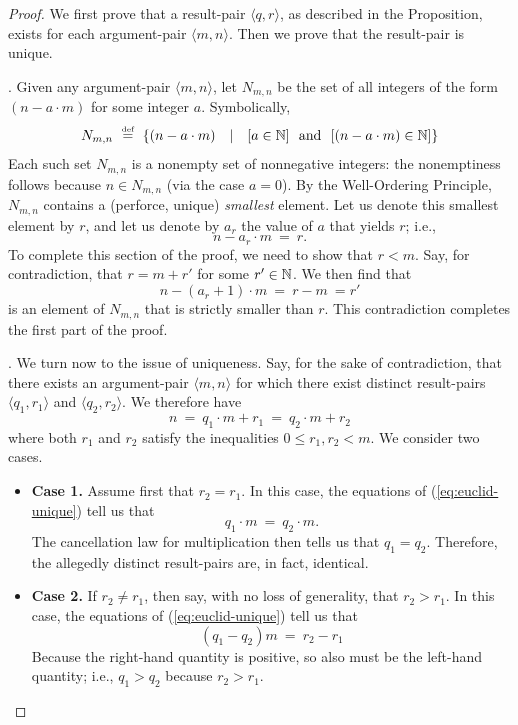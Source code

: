 \begin{proof}
We first prove that a result-pair $\langle q, r \rangle$, as described in the Proposition, exists for each argument-pair $\langle m, n \rangle$.  Then we prove that the result-pair is unique.

\medskip

.
Given any argument-pair $\langle m, n \rangle$, let $N_{m,n}$ be the set of all integers of the form $(n - a \cdot m)$ for some integer $a$.  Symbolically,
\[ N_{m,n} \ \eqdef \ \{ (n - a \cdot m) \ \ \ | \ \ \   [ a  \in \N] \  \mbox{ and } \ 
[(n - a \cdot m) \in \N]  \}
\]
Each such set $N_{m,n}$ is a nonempty set of nonnegative integers: the nonemptiness follows because $n \in N_{m,n}$ (via the case $a=0$).  By the Well-Ordering Principle, $N_{m,n}$ contains a (perforce, unique) {\em smallest} element.  Let us denote this smallest element by $r$, and let us denote by $a_r$ the value of $a$ that yields $r$; i.e.,
\[ n - a_r \cdot m \ = \ r.  \]
To complete this section of the proof, we need to show that $r < m$.  Say, for contradiction, that $r = m+r'$ for some $r' \in \mathbb{N}$.  We then find that
\[ n - (a_r +1)  \cdot m \ = \ r -m \ = r' \]
is an element of $N_{m,n}$ that is strictly smaller than $r$.  This contradiction completes the first part of the proof.

\medskip

.
We turn now to the issue of uniqueness.  Say, for the sake of contradiction, that there exists an argument-pair $\langle m, n \rangle$ for which there exist distinct result-pairs $\langle q_1, r_1 \rangle$ and $\langle q_2, r_2 \rangle$.  We therefore have
\begin{equation}
\label{eq:euclid-unique}
n \ = \ q_1 \cdot m + r_1 \ = \ q_2 \cdot m + r_2
\end{equation}
where both $r_1$ and $r_2$ satisfy the inequalities $0 \leq r_1, r_2 <m$.  We consider two cases.
\begin{itemize}
\item \textbf{Case 1.}
Assume first that $r_2 = r_1$.  In this case, the equations of (\ref{eq:euclid-unique}) tell us that
\[ q_1 \cdot m \ = \ q_2 \cdot m. \]
The cancellation law for multiplication then tells us that $q_1 = q_2$.  Therefore, the allegedly distinct result-pairs are, in fact, identical.

\medskip\item \textbf{Case 2.}
If $r_2 \neq r_1$, then say, with no loss of generality, that $r_2 > r_1$.  In this case, the equations of (\ref{eq:euclid-unique}) tell us that
\[ (q_1 - q_2) m \ = \ r_2 - r_1  \]
Because the right-hand quantity is positive, so also must be the left-hand quantity; i.e., $q_1 > q_2$ because $r_2 > r_1$.


\end{itemize}
\end{proof}
